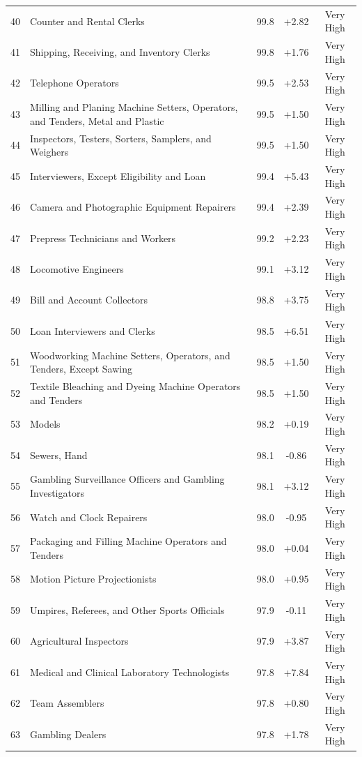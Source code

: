 {\begin{longtable}{rp{7cm}ccc}
40 & Counter and Rental Clerks & 99.8 & +2.82 & Very High \\
41 & Shipping, Receiving, and Inventory Clerks & 99.8 & +1.76 & Very High \\
42 & Telephone Operators & 99.5 & +2.53 & Very High \\
43 & Milling and Planing Machine Setters, Operators, and Tenders, Metal and Plastic & 99.5 & +1.50 & Very High \\
44 & Inspectors, Testers, Sorters, Samplers, and Weighers & 99.5 & +1.50 & Very High \\
45 & Interviewers, Except Eligibility and Loan & 99.4 & +5.43 & Very High \\
46 & Camera and Photographic Equipment Repairers & 99.4 & +2.39 & Very High \\
47 & Prepress Technicians and Workers & 99.2 & +2.23 & Very High \\
48 & Locomotive Engineers & 99.1 & +3.12 & Very High \\
49 & Bill and Account Collectors & 98.8 & +3.75 & Very High \\
50 & Loan Interviewers and Clerks & 98.5 & +6.51 & Very High \\
51 & Woodworking Machine Setters, Operators, and Tenders, Except Sawing & 98.5 & +1.50 & Very High \\
52 & Textile Bleaching and Dyeing Machine Operators and Tenders & 98.5 & +1.50 & Very High \\
53 & Models & 98.2 & +0.19 & Very High \\
54 & Sewers, Hand & 98.1 & -0.86 & Very High \\
55 & Gambling Surveillance Officers and Gambling Investigators & 98.1 & +3.12 & Very High \\
56 & Watch and Clock Repairers & 98.0 & -0.95 & Very High \\
57 & Packaging and Filling Machine Operators and Tenders & 98.0 & +0.04 & Very High \\
58 & Motion Picture Projectionists & 98.0 & +0.95 & Very High \\
59 & Umpires, Referees, and Other Sports Officials & 97.9 & -0.11 & Very High \\
60 & Agricultural Inspectors & 97.9 & +3.87 & Very High \\
61 & Medical and Clinical Laboratory Technologists & 97.8 & +7.84 & Very High \\
62 & Team Assemblers & 97.8 & +0.80 & Very High \\
63 & Gambling Dealers & 97.8 & +1.78 & Very High \\

\end{longtable}}
